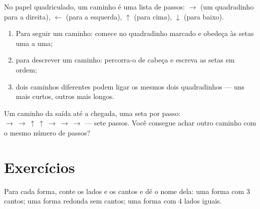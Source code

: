 \begin{method}\label{met:g1:shapes:path}
No papel quadriculado, um caminho é uma lista de passos:
$\to$ (um quadradinho para a direita), $\leftarrow$ (para a
esquerda), $\uparrow$ (para cima), $\downarrow$ (para baixo).
\begin{enumerate}
  \item Para seguir um caminho: comece no quadradinho marcado e
        obedeça às setas uma a uma;
  \item para descrever um caminho: percorra-o de cabeça e escreva as
        setas em ordem;
  \item dois caminhos diferentes podem ligar os mesmos dois
        quadradinhos --- uns mais curtos, outros mais longos.
\end{enumerate}
\end{method}

\begin{omfigure}

{\small Um caminho da saída até a chegada, uma seta por passo:
$\to\ \to\ \uparrow\ \uparrow\ \to\ \to\ \to$ --- sete passos. Você
consegue achar outro caminho com o mesmo número de passos?}
\end{omfigure}

\section{Exercícios}

\begin{exercise}[$\star$]\label{exo:g1:shapes:1}
Para cada forma, conte os lados e os cantos e dê o nome dela: uma
forma com $3$ cantos; uma forma redonda sem cantos; uma forma com
$4$ lados iguais.
\end{exercise}

